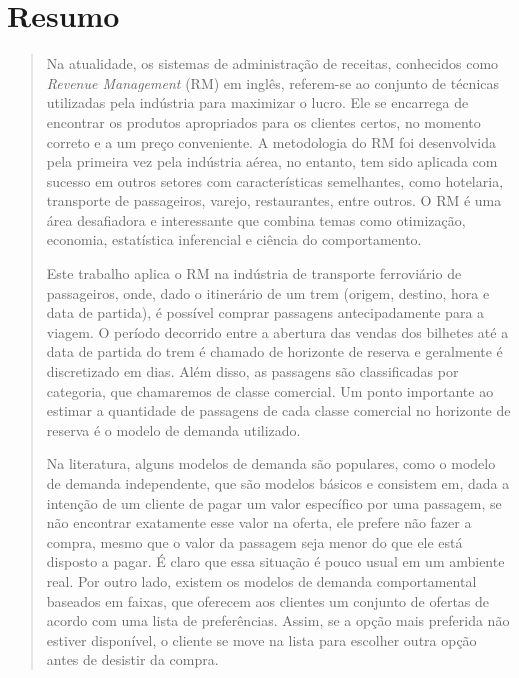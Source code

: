 \chapter*{Resumo}

\vspace{-1.0cm}
\begin{quotation}
	Na atualidade, os sistemas de administração de receitas, conhecidos como { \it Revenue Management} (RM) em inglês, referem-se ao conjunto de técnicas utilizadas pela indústria para maximizar o lucro. Ele se encarrega de encontrar os produtos apropriados para os clientes certos, no momento correto e a um preço conveniente. A metodologia do RM foi desenvolvida pela primeira vez pela indústria aérea, no entanto, tem sido aplicada com sucesso em outros setores com características semelhantes, como hotelaria, transporte de passageiros, varejo, restaurantes, entre outros. O RM é uma área desafiadora e interessante que combina temas como otimização, economia, estatística inferencial e ciência do comportamento.

	Este trabalho aplica o RM na indústria de transporte ferroviário de passageiros, onde, dado o itinerário de um trem (origem, destino, hora e data de partida), é possível comprar passagens antecipadamente para a viagem. O período decorrido entre a abertura das vendas dos bilhetes até a data de partida do trem é chamado de horizonte de reserva e geralmente é discretizado em dias. Além disso, as passagens são classificadas por categoria, que chamaremos de classe comercial. Um ponto importante ao estimar a quantidade de passagens de cada classe comercial no horizonte de reserva é o modelo de demanda utilizado.

	Na literatura, alguns modelos de demanda são populares, como o modelo de demanda independente, que são modelos básicos e consistem em, dada a intenção de um cliente de pagar um valor específico por uma passagem, se não encontrar exatamente esse valor na oferta, ele prefere não fazer a compra, mesmo que o valor da passagem seja menor do que ele está disposto a pagar. É claro que essa situação é pouco usual em um ambiente real. Por outro lado, existem os modelos de demanda comportamental baseados em faixas, que oferecem aos clientes um conjunto de ofertas de acordo com uma lista de preferências. Assim, se a opção mais preferida não estiver disponível, o cliente se move na lista para escolher outra opção antes de desistir da compra.


\end{quotation}
